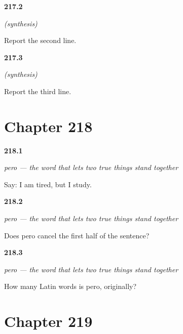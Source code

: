 \noindent\begin{minipage}[t]{\linewidth}
\raggedright
\hypertarget{review-ES-C57-sintesis-reportar-two}{\textbf{217.2}} \emph{(synthesis)}\par
\small Report the second line.
\end{minipage}\par\medskip

\noindent\begin{minipage}[t]{\linewidth}
\raggedright
\hypertarget{review-ES-C57-sintesis-reportar-three}{\textbf{217.3}} \emph{(synthesis)}\par
\small Report the third line.
\end{minipage}\par\medskip

\section*{Chapter 218}

\noindent\begin{minipage}[t]{\linewidth}
\raggedright
\hypertarget{review-ES-C58-pero-say}{\textbf{218.1}} \emph{pero — the word that lets two true things stand together}\par
\small Say: I am tired, but I study.
\end{minipage}\par\medskip

\noindent\begin{minipage}[t]{\linewidth}
\raggedright
\hypertarget{review-ES-C58-pero-keeps}{\textbf{218.2}} \emph{pero — the word that lets two true things stand together}\par
\small Does pero cancel the first half of the sentence?
\end{minipage}\par\medskip

\noindent\begin{minipage}[t]{\linewidth}
\raggedright
\hypertarget{review-ES-C58-pero-origin}{\textbf{218.3}} \emph{pero — the word that lets two true things stand together}\par
\small How many Latin words is pero, originally?
\end{minipage}\par\medskip

\section*{Chapter 219}

